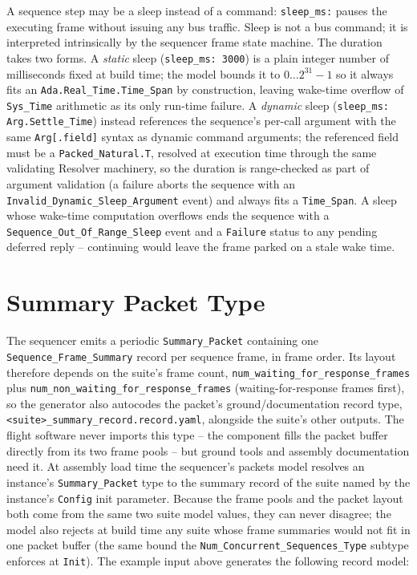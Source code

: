 A sequence step may be a sleep instead of a command: \texttt{sleep\_ms:} pauses the executing frame without issuing any bus traffic. Sleep is not a bus command; it is interpreted intrinsically by the sequencer frame state machine. The duration takes two forms. A \emph{static} sleep (\texttt{sleep\_ms: 3000}) is a plain integer number of milliseconds fixed at build time; the model bounds it to $0 \dots 2^{31}-1$ so it always fits an \texttt{Ada.Real\_Time.Time\_Span} by construction, leaving wake-time overflow of \texttt{Sys\_Time} arithmetic as its only run-time failure. A \emph{dynamic} sleep (\texttt{sleep\_ms: Arg.Settle\_Time}) instead references the sequence's per-call argument with the same \texttt{Arg[.field]} syntax as dynamic command arguments; the referenced field must be a \texttt{Packed\_Natural.T}, resolved at execution time through the same validating Resolver machinery, so the duration is range-checked as part of argument validation (a failure aborts the sequence with an \texttt{Invalid\_Dynamic\_Sleep\_Argument} event) and always fits a \texttt{Time\_Span}. A sleep whose wake-time computation overflows ends the sequence with a \texttt{Sequence\_Out\_Of\_Range\_Sleep} event and a \texttt{Failure} status to any pending deferred reply -- continuing would leave the frame parked on a stale wake time.

\section{Summary Packet Type}

The sequencer emits a periodic \texttt{Summary\_Packet} containing one \texttt{Sequence\_Frame\_Summary} record per sequence frame, in frame order. Its layout therefore depends on the suite's frame count, \texttt{num\_waiting\_for\_response\_frames} plus \texttt{num\_non\_waiting\_for\_response\_frames} (waiting-for-response frames first), so the generator also autocodes the packet's ground/documentation record type, \texttt{<suite>\_summary\_record.record.yaml}, alongside the suite's other outputs. The flight software never imports this type -- the component fills the packet buffer directly from its two frame pools -- but ground tools and assembly documentation need it. At assembly load time the sequencer's packets model resolves an instance's \texttt{Summary\_Packet} type to the summary record of the suite named by the instance's \texttt{Config} init parameter. Because the frame pools and the packet layout both come from the same two suite model values, they can never disagree; the model also rejects at build time any suite whose frame summaries would not fit in one packet buffer (the same bound the \texttt{Num\_Concurrent\_Sequences\_Type} subtype enforces at \texttt{Init}). The example input above generates the following record model:



